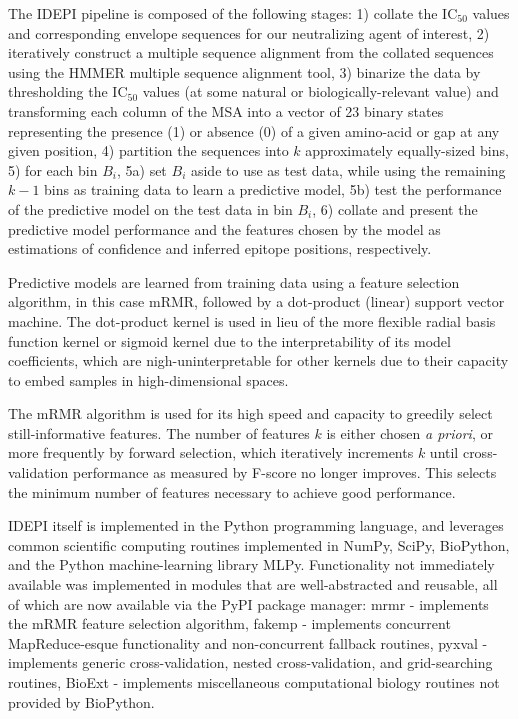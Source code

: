 \documentclass[10pt]{article}
\newcommand{\hmic}{{IC}$_{50}$}
\newcommand{\idepi}{{IDEPI}}
\newcommand{\mrmr}{{mRMR}}
\begin{document}
The \idepi{} pipeline is composed of the following stages:
1) collate the \hmic{} values and corresponding envelope sequences for our neutralizing agent of interest,
2) iteratively construct a multiple sequence alignment from the collated sequences using the {HMMER} multiple sequence alignment tool,
3) binarize the data by thresholding the \hmic{} values (at some natural or biologically-relevant value)
and transforming each column of the MSA into a vector of 23 binary states representing the presence (1) or absence (0) of a given amino-acid or gap at any given position,
4) partition the sequences into $k$ approximately equally-sized bins,
5) for each bin $B_i$,
5a) set $B_i$ aside to use as test data, while using the remaining $k-1$ bins as training data to learn a predictive model,
5b) test the performance of the predictive model on the test data in bin $B_i$,
6) collate and present the predictive model performance and the features chosen by the model as estimations of confidence and inferred epitope positions, respectively.

Predictive models are learned from training data using a feature selection algorithm,
in this case \mrmr{}, followed by a dot-product (linear) support vector machine.
The dot-product kernel is used in lieu of the more flexible radial basis function kernel or sigmoid kernel
due to the interpretability of its model coefficients,
which are nigh-uninterpretable for other kernels due to their capacity to embed samples in high-dimensional spaces.

The \mrmr{} algorithm is used for its high speed and capacity to greedily select still-informative features.
The number of features $k$ is either chosen \emph{a priori},
or more frequently by forward selection,
which iteratively increments $k$ until cross-validation performance as measured by F-score no longer improves.
This selects the minimum number of features necessary to achieve good performance.

\idepi{} itself is implemented in the Python programming language,
and leverages common scientific computing routines implemented in NumPy, SciPy, BioPython,
and the Python machine-learning library MLPy.
Functionality not immediately available was implemented in modules that are well-abstracted and reusable,
all of which are now available via the PyPI package manager:
mrmr - implements the \mrmr{} feature selection algorithm,
fakemp - implements concurrent MapReduce-esque functionality and non-concurrent fallback routines,
pyxval - implements generic cross-validation, nested cross-validation, and grid-searching routines,
BioExt - implements miscellaneous computational biology routines not provided by BioPython.
\end{document}
